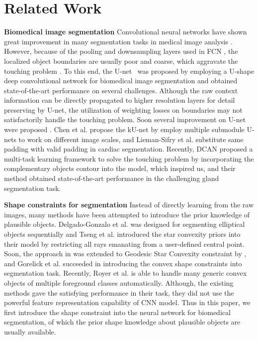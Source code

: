 \section{Related Work}
\textbf{Biomedical image segmentation} Convolutional neural networks have shown great improvement in many segmentation tasks in medical image analysis \cite{Dhungel2015a,Roth2015a,Roth2016,Chen2016e,Nogues2016,Dou2016,Qin2016,Chen2017,Ronneberger2015,Lieman-Sifry2017,Chen2016c}.
However, because of the pooling and downsampling layers used in FCN \cite{Long2015}, the localized object boundaries are usually poor and coarse, which aggravate the touching problem \cite{Dou2016,Chen2017,Ronneberger2015,Lieman-Sifry2017,Chen2016c}.
To this end, the U-net~\cite{Ronneberger2015} was proposed by employing a U-shape deep convolutional network for biomedical image segmentation and obtained state-of-the-art performance on several challenges.
Although the raw context information can be directly propagated to higher resolution layers for detail preserving by U-net, the utilization of weighting losses on boundaries may not satisfactorily handle the touching problem.
Soon several improvement on U-net were proposed \cite{Lieman-Sifry2017,Chen2016c,Cicek2016}.
Chen et al. \cite{Chen2016c} propose the kU-net by employ multiple submodule U-nets to work on different image scales, and Lieman-Sifry et al. \cite{Lieman-Sifry2017} substitute same padding with valid padding in cardiac segmentation.
Recently, DCAN \cite{Chen2017} proposed a multi-task learning framework to solve the touching problem by incorporating the complementary objects contour into the model, which inspired us, and their method obtained state-of-the-art performance in the challenging gland segmentation task.

\textbf{Shape constraints for segmentation} Instead of directly learning from the raw images, many methods have been attempted to introduce the prior knowledge of plausible objects.
Delgado-Gonzalo et al. \cite{Delgado-Gonzalo2012} was designed for segmenting elliptical objects sequentially and Tseng et al. \cite{Veksler2008a} introduced the star convexity priors into their model by restricting all rays emanating from a user-defined central point.
Soon, the approach in \cite{Veksler2008a} was extended to Geodesic Star Convexity constraint by \cite{Gulshan2010a}, and Gorelick et al. \cite{Gorelick2014a} succeeded in introducing the convex shape constraints into segmentation task.
Recently, Royer et al. \cite{Royer2016a} is able to handle many generic convex objects of multiple foreground classes automatically.
Although, the existing methods gave the satisfying performance in their task, they did not use the powerful feature representation capability of CNN model.
Thus in this paper, we first introduce the shape constraint into the neural network for biomedical segmentation, of which the prior shape knowledge about plausible objects are usually available.
